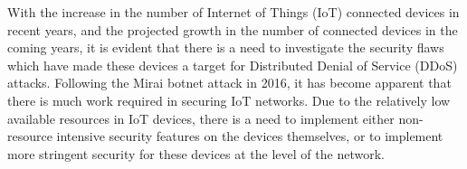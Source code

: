 With the increase in the number of Internet of Things (IoT) connected devices
in recent years, and the projected growth in the number of connected devices in
the coming years, it is evident that there is a need to investigate the
security flaws which have made these devices a target for Distributed Denial of
Service (DDoS) attacks. Following the Mirai botnet attack in 2016, it has become
apparent that there is much work required in securing IoT networks. Due to the
relatively low available resources in IoT devices, there is a need to implement
either non-resource intensive security features on the devices themselves, or to
implement more stringent security for these devices at the level of the network.
